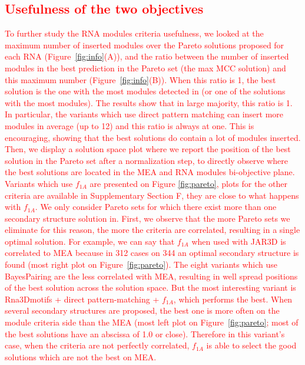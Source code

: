 \documentclass{bioinfo}
\begin{document}
\textcolor{red}{
\subsection{Usefulness of the two objectives}
To further study the RNA modules criteria usefulness, we looked at the maximum number of inserted modules over the Pareto solutions proposed for each RNA (Figure~\ref{fig:info}(A)), and the ratio between the number of inserted modules in the best prediction in the Pareto set (the max MCC solution) and this maximum number (Figure~\ref{fig:info}(B)).
When this ratio is 1, the best solution is the one with the most modules detected in (or one of the solutions with the most modules). The results show that in large majority, this ratio is 1. 
In particular, the variants which use direct pattern matching can insert more modules in average (up to 12) and this ratio is always at one. This is encouraging, showing that the best solutions do contain a lot of modules inserted.\\
Then, we display a solution space plot where we report the position of the best solution in the Pareto set after a normalization step, to directly observe where the best solutions are located in the MEA and RNA modules bi-objective plane. Variants which use $f_{1A}$ are presented on Figure \ref{fig:pareto}, plots for the other criteria are available in Supplementary Section F, they are close to what happens with $f_{1A}$. We only consider Pareto sets for which there exist more than one secondary structure solution in. 
First, we observe that the more Pareto sets we eliminate for this reason, the more the criteria are correlated, resulting in a single optimal solution. For example, we can say that $f_{1A}$ when used with JAR3D is correlated to MEA because in 312 cases on 344 an optimal secondary structure is found (most right plot on Figure~\ref{fig:pareto}). The eight variants which use BayesPairing are the less correlated with MEA, resulting in well spread positions of the best solution across the solution space. 
But the most interesting variant is Rna3Dmotifs + direct pattern-matching + $f_{1A}$, which performs the best. When several secondary structures are proposed, the best one is more often on the module criteria side than the MEA (most left plot on Figure~\ref{fig:pareto}; most of the best solutions have an abscissa of 1.0 or close). Therefore in this variant's case, when the criteria are not perfectly correlated, $f_{1A}$ is able to select the good solutions which are not the best on MEA.
}
\end{document}
